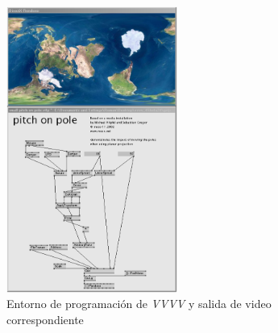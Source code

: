 \begin{figure}[H]
  \centering
    \includegraphics[width=0.5\textwidth]{./Cap3_aplicaciones/apps-vvvv.png}
  \caption{Entorno de programación de \emph{VVVV} y salida de video correspondiente}
  \label{fig:Apps-VVVV}
\end{figure}

